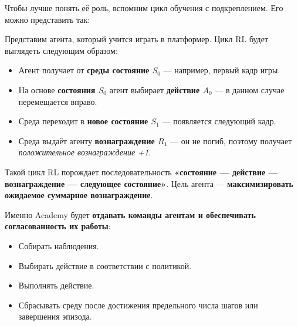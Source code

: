 \documentclass[11pt,a4paper]{article}
\begin{document}
Чтобы лучше понять её роль, вспомним цикл обучения с подкреплением. Его можно представить так:


Представим агента, который учится играть в платформер. Цикл RL будет выглядеть следующим образом:


\begin{itemize}
\tightlist
\item
  Агент получает от \textbf{среды состояние \(S_0\)} --- например, первый кадр игры.
\item
  На основе \textbf{состояния \(S_0\)} агент выбирает \textbf{действие \(A_0\)} --- в данном случае перемещается вправо.
\item
  Среда переходит в \textbf{новое состояние \(S_1\)} --- появляется следующий кадр.
\item
  Среда выдаёт агенту \textbf{вознаграждение \(R_1\)} --- он не погиб, поэтому получает \emph{положительное вознаграждение +1}.
\end{itemize}

Такой цикл RL порождает последовательность \textbf{«состояние --- действие --- вознаграждение --- следующее состояние»}. Цель агента --- \textbf{максимизировать ожидаемое суммарное вознаграждение}.

Именно Academy будет \textbf{отдавать команды агентам и обеспечивать согласованность их работы}:

\begin{itemize}
\tightlist
\item
  Собирать наблюдения.
\item
  Выбирать действие в соответствии с политикой.
\item
  Выполнять действие.
\item
  Сбрасывать среду после достижения предельного числа шагов или завершения эпизода.
\end{itemize}

\end{document}
